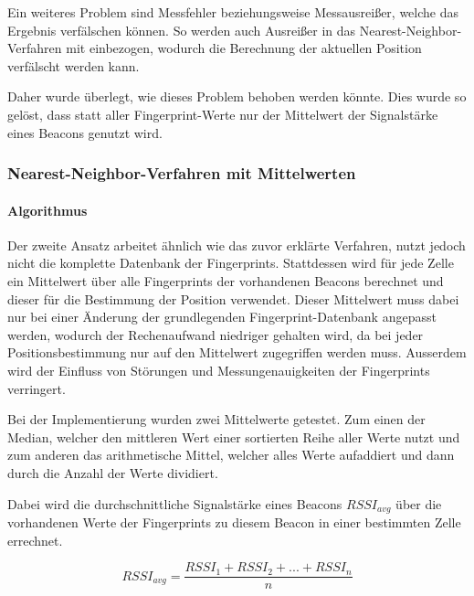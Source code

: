 Ein weiteres Problem sind Messfehler beziehungsweise Messausreißer, welche das Ergebnis verfälschen können. So werden auch Ausreißer in das Nearest-Neighbor-Verfahren mit einbezogen, wodurch die Berechnung der aktuellen Position verfälscht werden kann.

Daher wurde überlegt, wie dieses Problem behoben werden könnte. Dies wurde so gelöst, dass statt aller Fingerprint-Werte nur der Mittelwert der Signalstärke eines Beacons genutzt wird.


\subsubsection{Nearest-Neighbor-Verfahren mit Mittelwerten}
\label{sec:implementation:fingerprinting:positioning:avg}

\paragraph{Algorithmus}
\label{sec:implementation:fingerprinting:positioning:avg:algorithm}

Der zweite Ansatz arbeitet ähnlich wie das zuvor erklärte Verfahren, nutzt jedoch nicht die komplette Datenbank der Fingerprints. 
Stattdessen wird für jede Zelle ein Mittelwert über alle Fingerprints der vorhandenen Beacons berechnet und dieser für die Bestimmung der Position verwendet.
Dieser Mittelwert muss dabei nur bei einer Änderung der grundlegenden Fingerprint-Datenbank angepasst werden, wodurch der Rechenaufwand niedriger gehalten wird, da bei jeder Positionsbestimmung nur auf den Mittelwert zugegriffen werden muss.
Ausserdem wird der Einfluss von Störungen und Messungenauigkeiten der Fingerprints verringert.

Bei der Implementierung wurden zwei Mittelwerte getestet. Zum einen der Median, welcher den mittleren Wert einer sortierten Reihe aller Werte nutzt und zum anderen das arithmetische Mittel, welcher alles Werte aufaddiert und dann durch die Anzahl der Werte dividiert.

Dabei wird die durchschnittliche Signalstärke eines Beacons $RSSI_{avg}$ über die vorhandenen Werte der Fingerprints zu diesem Beacon in einer bestimmten Zelle errechnet.

\begin{equation}
	RSSI_{avg} = \frac{RSSI_{1} + RSSI_{2} + ... + RSSI_{n}}{n}
\end{equation}

